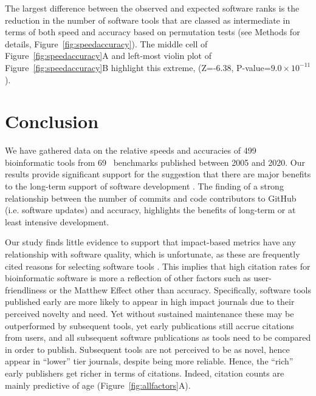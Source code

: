 \documentclass{bmcart}
\def\numTools{499}
\def\numBenchmarkPubs{69}
\begin{document}
The largest difference between the observed and expected software ranks is the reduction in the number of software tools that are
classed as intermediate in terms of both speed and accuracy based on
permutation tests (see Methods for details, Figure~\ref{fig:speedaccuracy}). The middle cell
of Figure~\ref{fig:speedaccuracy}A and left-most violin plot of Figure~\ref{fig:speedaccuracy}B highlight this extreme, (Z=-6.38,
P-value=$9.0\times 10^{-11}$). 

\section*{Conclusion}

We have gathered data on the relative speeds and accuracies of
\numTools~ bioinformatic tools from
\numBenchmarkPubs~ benchmarks published between
2005 and 2020. Our results provide significant support for the suggestion that there are major benefits to
the long-term support of software development \cite{siepel2019challenges}.
The
finding of a strong relationship between the number of commits and code contributors to
GitHub (i.e. software updates) and accuracy, highlights the benefits of
long-term or at least intensive development.

Our study finds little evidence to support that impact-based metrics
have any relationship with software quality, which is unfortunate, as these
are frequently cited reasons for selecting software tools
\cite{Loman2015-bw}. This implies that high citation
rates for bioinformatic software
\cite{Perez-Iratxeta2007-lv,Van_Noorden2014-kc,Wren2016-xy} is more a
reflection of other factors such as user-friendliness or the Matthew Effect
\cite{Lariviere2010-kx,Merton1968-cb} other than accuracy.
     {\color{red} Specifically, software tools published early are
       more likely to appear in high impact journals due to their
       perceived novelty and need. Yet without sustained maintenance
       these may be outperformed by subsequent tools, yet early
       publications still accrue citations from users, and all
       subsequent software publications as tools need to be compared
       in order to publish. Subsequent tools are not perceived to be
       as novel, hence appear in ``lower'' tier journals, despite
       being more reliable. Hence, the ``rich'' early publishers get
       richer in terms of citations. Indeed, citation counts are
       mainly predictive of age (Figure~\ref{fig:allfactors}A).}
\end{document}

